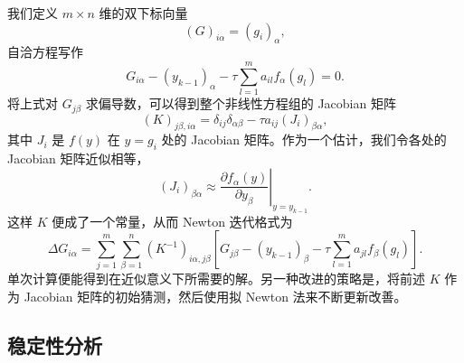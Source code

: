我们定义 $m\times n$ 维的双下标向量
\begin{equation}
 (G)_{i\alpha}=(g_i)_\alpha,
\tag{4.3.25}
\end{equation}
自洽方程写作
\begin{equation}
 G_{i\alpha}-(y_{k-1})_\alpha-\tau\sum_{l=1}^{m}a_{il}f_\alpha(g_l)=0.
\tag{4.3.26}
\end{equation}
将上式对 $G_{j\beta}$ 求偏导数，可以得到整个非线性方程组的 Jacobian 矩阵
\begin{equation}
 (K)_{j\beta,i\alpha}=\delta_{ij}\delta_{\alpha\beta}-\tau a_{ij}(J_i)_{\beta\alpha},
\tag{4.3.27}
\end{equation}
其中 $J_i$ 是 $f(y)$ 在 $y=g_i$ 处的 Jacobian 矩阵。作为一个估计，我们令各处的 Jacobian 矩阵近似相等，
\begin{equation}
 (J_i)_{\beta\alpha}\approx\left.\frac{\partial f_\alpha(y)}{\partial y_\beta}\right|_{y=y_{k-1}}.
\tag{4.3.28}
\end{equation}
这样 $K$ 便成了一个常量，从而 Newton 迭代格式为
\begin{equation}
 \Delta G_{i\alpha}
 =\sum_{j=1}^{m}\sum_{\beta=1}^{n}(K^{-1})_{i\alpha,j\beta}
 \left[G_{j\beta}-(y_{k-1})_\beta-\tau\sum_{l=1}^{m}a_{jl}f_\beta(g_l)\right].
\tag{4.3.29}
\end{equation}
单次计算便能得到在近似意义下所需要的解。另一种改进的策略是，将前述 $K$ 作为 Jacobian 矩阵的初始猜测，然后使用拟 Newton 法来不断更新改善。

\subsection{稳定性分析}

